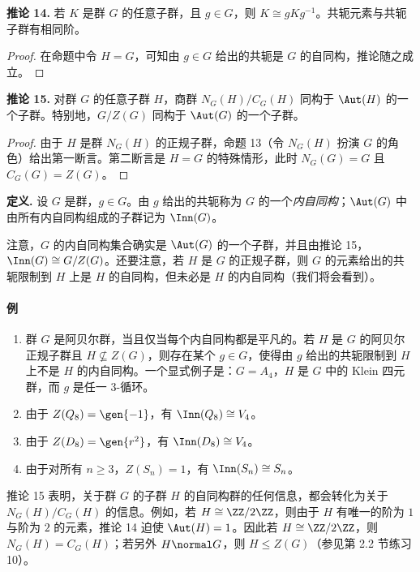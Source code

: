 \medskip
\noindent\textbf{推论 14.} 若 $K$ 是群 $G$ 的任意子群，且 $g\in G$，则 $K\cong gKg^{-1}$。共轭元素与共轭子群有相同阶。

\begin{proof}
在命题中令 $H=G$，可知由 $g\in G$ 给出的共轭是 $G$ 的自同构，推论随之成立。
\end{proof}

\medskip
\noindent\textbf{推论 15.} 对群 $G$ 的任意子群 $H$，商群 $N_G(H)/C_G(H)$ 同构于 $\Aut(H)$ 的一个子群。特别地，$G/Z(G)$ 同构于 $\Aut(G)$ 的一个子群。

\begin{proof}
由于 $H$ 是群 $N_G(H)$ 的正规子群，命题 13（令 $N_G(H)$ 扮演 $G$ 的角色）给出第一断言。第二断言是 $H=G$ 的特殊情形，此时 $N_G(G)=G$ 且 $C_G(G)=Z(G)$。
\end{proof}

\noindent\textbf{定义.} 设 $G$ 是群，$g\in G$。由 $g$ 给出的共轭称为 $G$ 的一个\emph{内自同构}；$\Aut(G)$ 中由所有内自同构组成的子群记为 $\Inn(G)$。

注意，$G$ 的内自同构集合确实是 $\Aut(G)$ 的一个子群，并且由推论 15，$\Inn(G)\cong G/Z(G)$。还要注意，若 $H$ 是 $G$ 的正规子群，则 $G$ 的元素给出的共轭限制到 $H$ 上是 $H$ 的自同构，但未必是 $H$ 的内自同构（我们将会看到）。

\paragraph{例}
\begin{enumerate}[label=(\arabic*)]
  \item 群 $G$ 是阿贝尔群，当且仅当每个内自同构都是平凡的。若 $H$ 是 $G$ 的阿贝尔正规子群且 $H\not\subseteq Z(G)$，则存在某个 $g\in G$，使得由 $g$ 给出的共轭限制到 $H$ 上不是 $H$ 的内自同构。一个显式例子是：$G=A_4$，$H$ 是 $G$ 中的 Klein 四元群，而 $g$ 是任一 $3$-循环。
  \item 由于 $Z(Q_8)=\gen{-1}$，有 $\Inn(Q_8)\cong V_4$。
  \item 由于 $Z(D_8)=\gen{r^2}$，有 $\Inn(D_8)\cong V_4$。
  \item 由于对所有 $n\geq3$，$Z(S_n)=1$，有 $\Inn(S_n)\cong S_n$。
\end{enumerate}

推论 15 表明，关于群 $G$ 的子群 $H$ 的自同构群的任何信息，都会转化为关于 $N_G(H)/C_G(H)$ 的信息。例如，若 $H\cong\ZZ/2\ZZ$，则由于 $H$ 有唯一的阶为 $1$ 与阶为 $2$ 的元素，推论 14 迫使 $\Aut(H)=1$。因此若 $H\cong\ZZ/2\ZZ$，则 $N_G(H)=C_G(H)$；若另外 $H\normal G$，则 $H\leq Z(G)$（参见第 2.2 节练习 10）。

